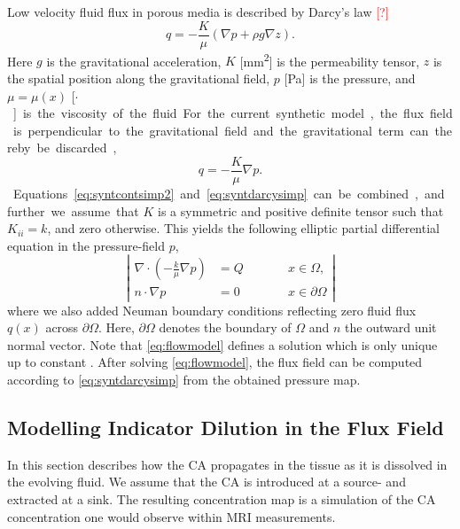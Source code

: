 \documentclass[paper=a4, fontsize=11pt,parskip=half,headings=small]{scrartcl}
\newcommand{\missingsource}{\textcolor{red}{[?]}}
\begin{document}
	Low velocity fluid flux in porous media is described by Darcy's law \missingsource
	\begin{equation}
		q = -\frac{K}{\mu} \left( \nabla p + \rho g  \nabla z \right).
	\end{equation}
	Here $g$ is the gravitational acceleration, $K$ [\si{\square\milli\meter}] is the permeability tensor, $z$ is the spatial position along the gravitational field, $p$ [\si{\pascal}] is the pressure, and $\mu = \mu(x)$ [\si{\pascal$\cdot$\second}] is the viscosity of the fluid.
	For the current synthetic model, the flux field is perpendicular to the gravitational field and the gravitational term can thereby be discarded,
	\begin{equation}
		q = -\frac{K}{\mu} \nabla p.
		\label{eq:syntdarcysimp}
	\end{equation}
	Equations \eqref{eq:syntcontsimp2} and \eqref{eq:syntdarcysimp} can be combined, and further we assume that $K$ is a symmetric and positive definite tensor such that $K_{ii} = k$, and zero otherwise.
	This yields the following elliptic partial differential equation in the pressure-field $p$,
	\begin{equation}
		\left\vert
		\begin{alignedat}{2}
			\nabla \cdot \left( -\frac{k}{\mu} \nabla p \right) &= Q  \qquad &&x \in \Omega, \\
			n \cdot \nabla p &=0 &&x \in \partial \Omega
		\end{alignedat}
		\right\vert 
		\label{eq:flowmodel}
	\end{equation}
	where we also added Neuman boundary conditions reflecting zero fluid flux $q(x)$ across $\partial \Omega$.
	Here, $\partial \Omega$ denotes the boundary of $\Omega$ and $n$ the outward unit normal vector. 
	Note that \eqref{eq:flowmodel} defines a solution which is only unique up to constant \cite{evans98}.
	After solving \eqref{eq:flowmodel}, the flux field can be computed according to \eqref{eq:syntdarcysimp} from the obtained pressure map. 
	
	
	\subsection{Modelling Indicator Dilution in the Flux Field}\label{sec:transport}
	
	In this section describes how the CA propagates in the tissue as it is dissolved in the evolving fluid.
	We assume that the CA is introduced at a source- and extracted at a sink.
	The resulting concentration map is a simulation of the CA concentration one would observe within MRI measurements.
	
\end{document}
